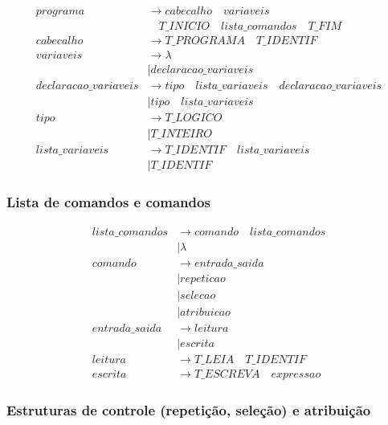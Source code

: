 \documentclass[
  brazilian,
  letterpaper,
]{book}
\theoremstyle{plain}
\theoremstyle{definition}
\theoremstyle{remark}
\begin{document}
\[
\begin{aligned}
programa
  &\rightarrow cabecalho \quad variaveis \\
  &\quad T\_INICIO
     \quad lista\_comandos \quad T\_FIM \\
cabecalho
  &\rightarrow T\_PROGRAMA \quad T\_IDENTIF \\
variaveis
  &\rightarrow \lambda \\
  &\mid declaracao\_variaveis \\[3pt]
declaracao\_variaveis
  &\rightarrow tipo \quad lista\_variaveis \quad
                declaracao\_variaveis \\
  &\mid tipo \quad lista\_variaveis \\
tipo
  &\rightarrow T\_LOGICO \\
  &\mid T\_INTEIRO \\
lista\_variaveis
  &\rightarrow T\_IDENTIF \quad lista\_variaveis \\
  &\mid T\_IDENTIF
\end{aligned}
\]

\subsubsection{Lista de comandos e
comandos}\label{lista-de-comandos-e-comandos}

\[
\begin{aligned}
lista\_comandos
  &\rightarrow comando \quad lista\_comandos \\
  &\mid \lambda \\[3pt]
comando
  &\rightarrow entrada\_saida \\
  &\mid repeticao \\
  &\mid selecao \\
  &\mid atribuicao \\[3pt]
entrada\_saida
  &\rightarrow leitura \\
  &\mid escrita \\[3pt]
leitura
  &\rightarrow T\_LEIA \quad T\_IDENTIF \\[3pt]
escrita
  &\rightarrow T\_ESCREVA \quad expressao
\end{aligned}
\]

\subsubsection{Estruturas de controle (repetição, seleção) e
atribuição}\label{estruturas-de-controle-repetiuxe7uxe3o-seleuxe7uxe3o-e-atribuiuxe7uxe3o}
\end{document}
